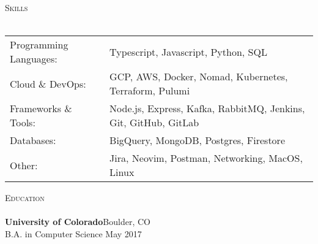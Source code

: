 \documentclass[a4paper]{article}
\newcommand{\lineunder} {
    \vspace*{-8pt} \\
    \hspace*{-18pt} \hrulefill \\
}
\newcommand{\header} [1] {
    {\hspace*{-18pt}\vspace*{6pt} \textsc{#1}}
    \vspace*{-6pt} \lineunder
}
\begin{document}
\header{Skills}
\begin{tabular}{ l l }
	Programming Languages: & Typescript, Javascript, Python, SQL                             \\
  Cloud \& DevOps:       & GCP, AWS, Docker, Nomad, Kubernetes, Terraform, Pulumi          \\
  Frameworks \& Tools:   & Node.js, Express, Kafka, RabbitMQ, Jenkins, Git, GitHub, GitLab \\
	Databases:             & BigQuery, MongoDB, Postgres, Firestore                          \\
	Other:                 & Jira, Neovim, Postman, Networking, MacOS, Linux                 \\
\end{tabular}
\vspace{2mm}


%

\header{Education}
\textbf{University of Colorado}\hfill Boulder, CO\\
B.A. in Computer Science  \hfill May 2017\\
\vspace{2mm}



%
%
%


\
\end{document}
